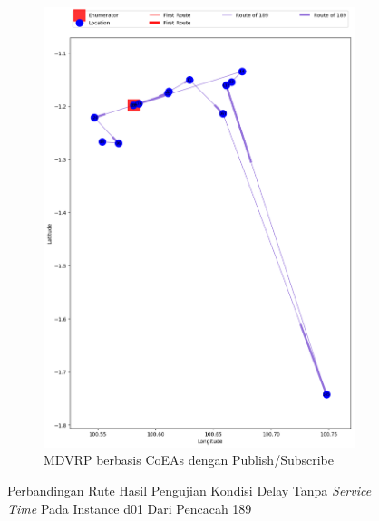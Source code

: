 \begin{figure}[H]\ContinuedFloat
	\centering
	\begin{subfigure}[t]{\textwidth}
		\centering
		\includegraphics[width=\textwidth]{Resources/Images/delayed_1/real_m15_n100_delayed_1_189_pubsub_coes}
		\caption{MDVRP berbasis CoEAs dengan Publish/Subscribe}
		\label{fig:real_m15_n100_delayed_1_189_pubsub_coes}
	\end{subfigure}
	\caption{Perbandingan Rute Hasil Pengujian Kondisi Delay Tanpa \textit{Service Time} Pada Instance d01 Dari Pencacah 189}
	\label{fig:real_m15_n100_delayed_1_189_contd}
\end{figure}


